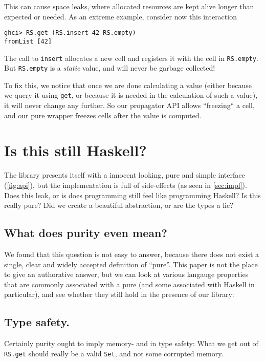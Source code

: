 \documentclass[manuscript,screen,acmsmall]{acmart}
\begin{document}
This can cause space leaks, where allocated resources are kept alive longer than expected or needed. As an extreme example, consider now this interaction
\begin{verbatim}
ghci> RS.get (RS.insert 42 RS.empty)
fromList [42]
\end{verbatim}
The call to \verb|insert| allocates a new cell and registers it with the cell in \verb|RS.empty|. But \verb|RS.empty| is a \emph{static} value, and will never be garbage collected!

To fix this, we notice that once we are done calculating a value (either because we query it using \verb|get|, or because it is needed in the calculation of such a value), it will never change any further. So our propagator API allows “freezing“ a cell, and our pure wrapper freezes cells after the value is computed.

\section{Is this still Haskell?}\label{sec:pure}

The library presents itself with a innocent looking, pure and simple interface (\cref{fig:api}), but the implementation is full of side-effects (as seen in \cref{sec:impl}).
Does this leak, or is does programming still feel like programming Haskell?
Is this really pure? Did we create a beautiful abstraction, or are the types a lie?

\subsection{What does purity even mean?}

We found that this question is not easy to answer, because there does not exist a single, clear and widely accepted definition of “pure”.
This paper is not the place to give an authorative answer, but we can look at various langauge properties that are commonly associated with a pure  (and some associated with Haskell in particular), and see whether they still hold in the presence of our library:

\subsection{Type safety.}

Certainly purity ought to imply memory- and in type safety: What we get out of \verb|RS.get| should really be a valid \verb|Set|, and not some corrupted memory.
\end{document}
